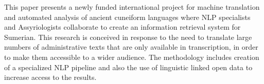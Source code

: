 This paper presents a newly funded international project for machine translation and automated analysis of ancient cuneiform languages where NLP specialists and Assyriologists collaborate to create an information retrieval system for Sumerian. This research is conceived in response to the need to translate large numbers of administrative texts that are only available in transcription, in order to make them accessible to a wider audience. The methodology includes creation of a specialized NLP pipeline and also the use of linguistic linked open data to increase access to the results.
